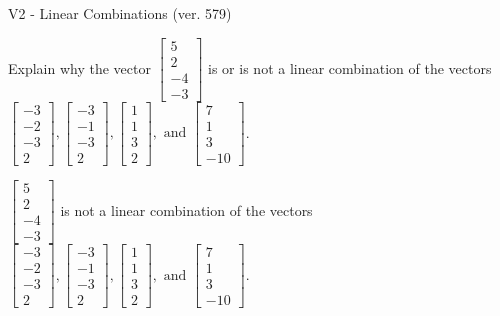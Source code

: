 \begin{exercise}
  \begin{exerciseTitle}V2 - Linear Combinations (ver. 579)\end{exerciseTitle}
  \begin{exerciseStatement}
    Explain why the vector \(\left[\begin{array}{c}
5 \\
2 \\
-4 \\
-3
\end{array}\right]\)  is or is not a linear 
	combination of the vectors \(\left[\begin{array}{c}
-3 \\
-2 \\
-3 \\
2
\end{array}\right] , \left[\begin{array}{c}
-3 \\
-1 \\
-3 \\
2
\end{array}\right] , \left[\begin{array}{c}
1 \\
1 \\
3 \\
2
\end{array}\right] , \text{ and } \left[\begin{array}{c}
7 \\
1 \\
3 \\
-10
\end{array}\right]\).
	


  \end{exerciseStatement}
  \begin{exerciseAnswer}
   \(\left[\begin{array}{c}
5 \\
2 \\
-4 \\
-3
\end{array}\right]\) 
  	 is not  
	a linear combination of the vectors \(\left[\begin{array}{c}
-3 \\
-2 \\
-3 \\
2
\end{array}\right] , \left[\begin{array}{c}
-3 \\
-1 \\
-3 \\
2
\end{array}\right] , \left[\begin{array}{c}
1 \\
1 \\
3 \\
2
\end{array}\right] , \text{ and } \left[\begin{array}{c}
7 \\
1 \\
3 \\
-10
\end{array}\right]\).


\end{exerciseAnswer}
\end{exercise}
